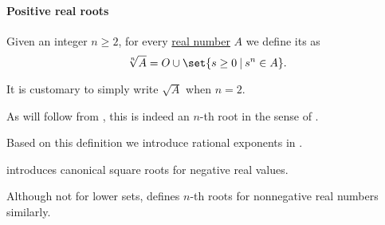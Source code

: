 \paragraph{Positive real roots}

\begin{definition}\label{def:principal_nonnegative_nth_root}\mimprovised
  Given an integer \( n \geq 2 \), for every  \hyperref[def:real_numbers]{real number} \( A \) we define its  as
  \begin{equation}\label{eq:def:principal_nonnegative_nth_root}
    \sqrt[n]{ A } = O \cup \set{ s \geq 0 \given s^n \in A }.
  \end{equation}

  It is customary to simply write \( \sqrt{ A } \) when \( n = 2 \).
\end{definition}
\begin{comments}
  \item As will follow from , this is indeed an \( n \)-th root in the sense of .

  \item Based on this definition we introduce rational exponents in .

  \item {} introduces canonical square roots for negative real values.

  \item Although not for lower sets,  defines \( n \)-th roots for nonnegative real numbers similarly.
\end{comments}
